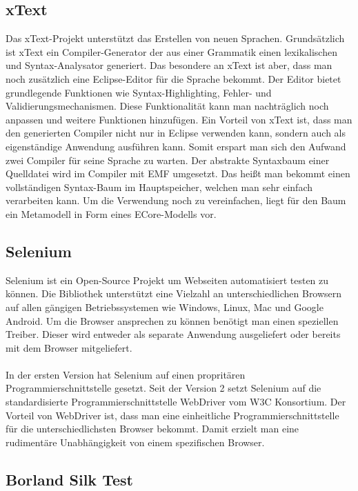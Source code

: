 \subsection{xText}

Das xText-Projekt unterstützt das Erstellen von neuen Sprachen. Grundsätzlich ist xText ein Compiler-Generator der aus einer Grammatik einen lexikalischen und Syntax-Analysator generiert. Das besondere an xText ist aber, dass man noch zusätzlich eine Eclipse-Editor für die Sprache bekommt. Der Editor bietet grundlegende Funktionen wie Syntax-Highlighting, Fehler- und Validierungsmechanismen. Diese Funktionalität kann man nachträglich noch anpassen und weitere Funktionen hinzufügen. Ein Vorteil von xText ist, dass man den generierten Compiler nicht nur in Eclipse verwenden kann, sondern auch als eigenständige Anwendung ausführen kann. Somit erspart man sich den Aufwand zwei Compiler für seine Sprache zu warten. Der abstrakte Syntaxbaum einer Quelldatei wird im Compiler mit EMF umgesetzt. Das heißt man bekommt einen vollständigen Syntax-Baum im Hauptspeicher, welchen man sehr einfach verarbeiten kann. Um die Verwendung noch zu vereinfachen, liegt für den Baum ein Metamodell in Form eines ECore-Modells vor. 

\subsection{Selenium}

Selenium ist ein Open-Source Projekt um Webseiten automatisiert testen zu können. Die Bibliothek unterstützt eine Vielzahl an unterschiedlichen Browsern auf allen gängigen Betriebssystemen wie Windows, Linux, Mac und Google Android. Um die Browser ansprechen zu können benötigt man einen speziellen Treiber. Dieser wird entweder als separate Anwendung ausgeliefert oder bereits mit dem Browser mitgeliefert.\\
\\In der ersten Version hat Selenium auf einen propritären Programmierschnittstelle gesetzt. Seit der Version 2 setzt Selenium auf die standardisierte Programmierschnittstelle WebDriver vom W3C Konsortium. Der Vorteil von WebDriver ist, dass man eine einheitliche Programmierschnittstelle für die unterschiedlichsten Browser bekommt. Damit erzielt man eine rudimentäre Unabhängigkeit von einem spezifischen Browser. 

\subsection{Borland Silk Test}


